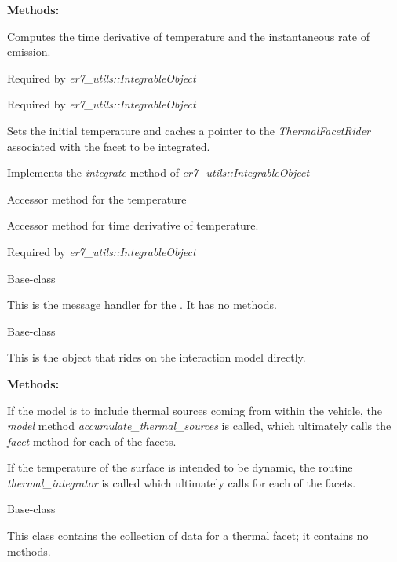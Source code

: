 \begin{enumerate}
{\bf Methods:}

\begin{enumerate}

\label{ref:integratecomputetempdot}
Computes the time derivative of temperature and the 
instantaneous rate of emission.

\label{integratecreateintegrators}
Required by \textit{er7\_utils::IntegrableObject}


\label{integratedestroyintegrators}
Required by \textit{er7\_utils::IntegrableObject}


\label{ref:integrateinitialize}
Sets the initial temperature and caches a pointer to the
\textit{ThermalFacetRider} associated with the facet to be integrated.


\label{ref:integrateintegrate}
Implements the \textit{integrate} method of 
\textit{er7\_utils::IntegrableObject}


\label{integrategettemp}
Accessor method for the temperature

\label{integrategettempdot}
Accessor method for time derivative of temperature.


\label{integrateresetintegrators}
Required by \textit{er7\_utils::IntegrableObject}
\end{enumerate}


  Base-class

This is the message handler for the \ThermalRiderDesc.  It has
no methods.



  Base-class

This is the object that rides on the interaction model directly.


{\bf Methods:}

\begin{enumerate}
If the model is to include thermal sources coming from within the
vehicle, the \textit{model} method \textit{accumulate\_thermal\_sources} is called,
which ultimately calls the \textit{facet} method
for each of the facets.

If the temperature of the surface is intended to be dynamic, the
routine \textit{thermal\_integrator} is called
which ultimately calls 
 for each of the facets.
\end{enumerate}

  Base-class

This class contains the collection of data for a thermal facet; it
contains no methods.


\end{enumerate}


